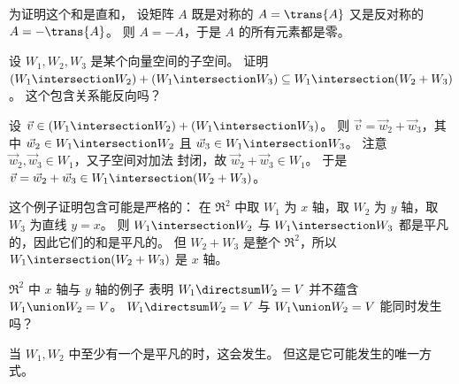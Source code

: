 \begin{exercises}
\begin{answer}
\begin{exparts}
         为证明这个和是直和，
         设矩阵 \( A \) 既是对称的
         \( A=\trans{A} \) 又是反对称的 \( A=-\trans{A} \)。
         则 \( A=-A \)，于是 \( A \) 的所有元素都是零。  
      \end{exparts}
     \end{answer}
  \item 
    设 \( W_1,W_2,W_3 \) 是某个向量空间的子空间。
    证明 \( (W_1\intersection W_2)+(W_1\intersection W_3)\subseteq
              W_1\intersection (W_2+W_3) \)。
    这个包含关系能反向吗？
    \begin{answer}
      设
      \( \vec{v}\in (W_1\intersection W_2)+(W_1\intersection W_3) \)。
      则 \( \vec{v}=\vec{w}_2+\vec{w}_3 \)，其中
      \( \vec{w}_2\in W_1\intersection W_2 \) 且
      \( \vec{w}_3\in W_1\intersection W_3 \)。
      注意 \( \vec{w}_2,\vec{w}_3\in W_1 \)，又子空间对加法
      封闭，故 \( \vec{w}_2+\vec{w}_3\in W_1 \)。
      于是 \( \vec{v}=\vec{w}_2+\vec{w}_3\in W_1\intersection(W_2+W_3) \)。

      这个例子证明包含可能是严格的：
      在 \( \Re^2 \) 中取 \( W_1 \) 为 \( x \) 轴，取 \( W_2 \)
      为 \( y \) 轴，取 \( W_3 \) 为直线 \( y=x \)。
      则 \( W_1\intersection W_2 \) 与 \( W_1\intersection W_3 \)
      都是平凡的，因此它们的和是平凡的。
      但 \( W_2+W_3 \) 是整个 \( \Re^2 \)，所以
      \( W_1\intersection(W_2+W_3) \) 是 \( x \) 轴。  
     \end{answer}
  \item 
    \( \Re^2 \) 中 $x$ 轴与 $y$ 轴的例子
    表明 \( W_1\directsum W_2=V \) 并不蕴含
    \( W_1\union W_2=V \)。
    \( W_1\directsum W_2=V \) 与 \( W_1\union W_2=V \)
    能同时发生吗？
    \begin{answer}
      当 \( W_1,W_2 \) 中至少有一个是平凡的时，这会发生。
      但这是它可能发生的唯一方式。


\end{answer}
\end{exercises}
